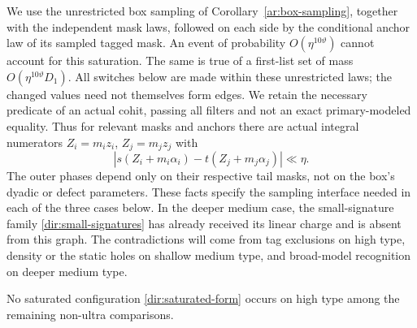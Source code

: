 We use the unrestricted box sampling of
Corollary~\ref{ar:box-sampling}, together with the independent mask
laws, followed on each side by the conditional anchor law of its
sampled tagged mask. An event of probability $O(\eta^{10\vartheta})$ cannot account
for this saturation. The same is true of a first-list set of mass
$O(\eta^{10\vartheta}D_1)$. All switches below are made within these
unrestricted laws; the changed values need not themselves form edges.
We retain the necessary predicate of an actual cohit, passing all
filters and not an exact primary-modeled equality. Thus for relevant
masks and anchors there are actual integral numerators
$Z_i=m_i z_i$, $Z_j=m_j z_j$ with
\begin{equation}\label{dir:actual-small-determinant}
 |s(Z_i+m_i\alpha_i)-t(Z_j+m_j\alpha_j)|\ll\eta.
\end{equation}
The outer phases depend only on their respective tail masks, not on the
box's dyadic or defect parameters. These facts specify the sampling
interface needed in each of the three cases below. In the deeper medium
case, the small-signature family \eqref{dir:small-signatures} has already
received its linear charge and is absent from this graph.
The contradictions will come from tag exclusions on high type, density
or the static holes on shallow medium type, and broad-model recognition
on deeper medium type.

\begin{lemma}\label{dir:high-box}
No saturated configuration \eqref{dir:saturated-form} occurs on high
type among the remaining non-ultra comparisons.
\end{lemma}

